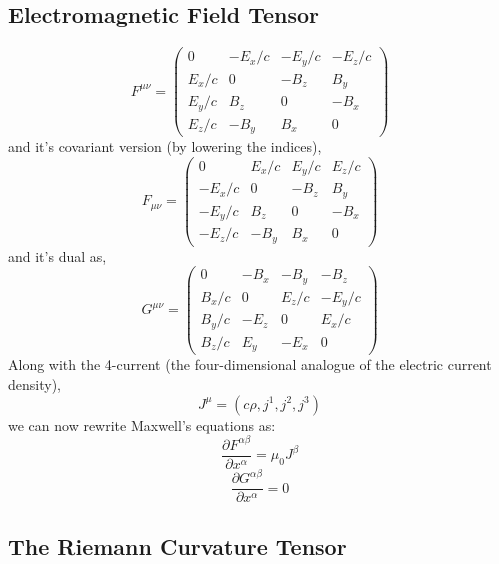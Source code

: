 \subsection{Electromagnetic Field Tensor}
\begin{equation}
F^{\mu \nu} = \begin{pmatrix}
0 & -E_{x}/c & -E_{y}/c & -E_{z}/c\\
E_{x}/c & 0 & -B_{z} & B_{y}\\
E_{y}/c & B_{z} & 0 & -B_{x}\\
E_{z}/c & -B_{y} & B_{x} & 0
\end{pmatrix}
\end{equation}
and it's covariant version (by lowering the indices),
\begin{equation}
F_{\mu \nu} = \begin{pmatrix}
0 & E_{x}/c & E_{y}/c & E_{z}/c\\
-E_{x}/c & 0 & -B_{z} & B_{y}\\
-E_{y}/c & B_{z} & 0 & -B_{x}\\
-E_{z}/c & -B_{y} & B_{x} & 0
\end{pmatrix}
\end{equation}
and it's dual as,
\begin{equation}
G^{\mu \nu} = \begin{pmatrix}
0 & -B_{x} & -B_{y} & -B_{z}\\
B_{x}/c & 0 & E_{z}/c & -E_{y}/c\\
B_{y}/c & -E_{z} & 0 & E_{x}/c\\
B_{z}/c & E_{y} & -E_{x} & 0
\end{pmatrix}
\end{equation}
Along with the 4-current (the four-dimensional analogue of the electric current density), $$J^{\mu} = (c\rho , j^{1}, j^{2}, j^{3})$$
we can now rewrite Maxwell's equations as:
\begin{equation}
\frac{\partial F^{\alpha \beta}}{\partial x^{\alpha}} = \mu_{0} J^{\beta}
\end{equation}
\begin{equation}
\frac{\partial G^{\alpha \beta}}{\partial x^{\alpha}} = 0
\end{equation}
\subsection{The Riemann Curvature Tensor}

